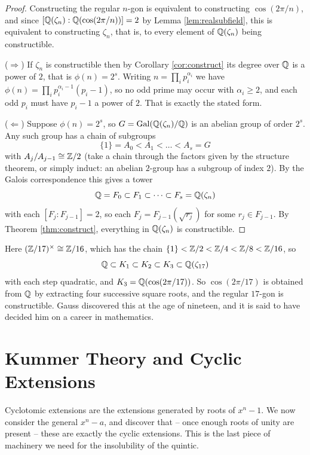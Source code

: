\documentclass[a4paper]{scrartcl}
\newcommand{\Gal}{\operatorname{Gal}}
\begin{document}
\begin{proof}
	Constructing the regular $n$-gon is equivalent to constructing $\cos(2\pi/n)$, and since $[\mathbb{Q}(\zeta_n) : \mathbb{Q}(\cos(2\pi/n))] = 2$ by Lemma \ref{lem:realsubfield}, this is equivalent to constructing $\zeta_n$, that is, to every element of $\mathbb{Q}(\zeta_n)$ being constructible.

	($\Rightarrow$) If $\zeta_n$ is constructible then by Corollary \ref{cor:construct} its degree over $\mathbb{Q}$ is a power of $2$, that is $\phi(n) = 2^s$. Writing $n = \prod_i p_i^{\alpha_i}$ we have $\phi(n) = \prod_i p_i^{\alpha_i-1}(p_i-1)$, so no odd prime may occur with $\alpha_i \geq 2$, and each odd $p_i$ must have $p_i - 1$ a power of $2$. That is exactly the stated form.

	($\Leftarrow$) Suppose $\phi(n) = 2^s$, so $G = \Gal(\Q(\zeta_n)/\Q)$ is an abelian group of order $2^s$. Any such group has a chain of subgroups
	$$\{1\} = A_0 < A_1 < \dots < A_s = G$$
	with $A_{j}/A_{j-1}\cong \mathbb{Z}/2$ (take a chain through the factors given by the structure theorem, or simply induct: an abelian $2$-group has a subgroup of index $2$). By the Galois correspondence this gives a tower
	$$\mathbb{Q} = F_0 \subset F_1 \subset \dots \subset F_s = \mathbb{Q}(\zeta_n)$$
	with each $[F_j : F_{j-1}] = 2$, so each $F_j = F_{j-1}(\sqrt{r_j})$ for some $r_j \in F_{j-1}$. By Theorem \ref{thm:construct}, everything in $\mathbb{Q}(\zeta_n)$ is constructible.
\end{proof}

\begin{example}
	Here $(\mathbb{Z}/17)^\times \cong \mathbb{Z}/16$, which has the chain $\{1\} < \mathbb{Z}/2 < \mathbb{Z}/4 < \mathbb{Z}/8 < \mathbb{Z}/16$, so
	$$\mathbb{Q} \subset K_1 \subset K_2 \subset K_3 \subset \mathbb{Q}(\zeta_{17})$$
	with each step quadratic, and $K_3 = \mathbb{Q}(\cos(2\pi/17))$. So $\cos(2\pi/17)$ is obtained from $\mathbb{Q}$ by extracting four successive square roots, and the regular $17$-gon is constructible. Gauss discovered this at the age of nineteen, and it is said to have decided him on a career in mathematics.
\end{example}

\section{Kummer Theory and Cyclic Extensions}\label{sec:kummer}

Cyclotomic extensions are the extensions generated by roots of $x^n-1$. We now consider the general $x^n - a$, and discover that -- once enough roots of unity are present -- these are exactly the cyclic extensions. This is the last piece of machinery we need for the insolubility of the quintic.
\end{document}
